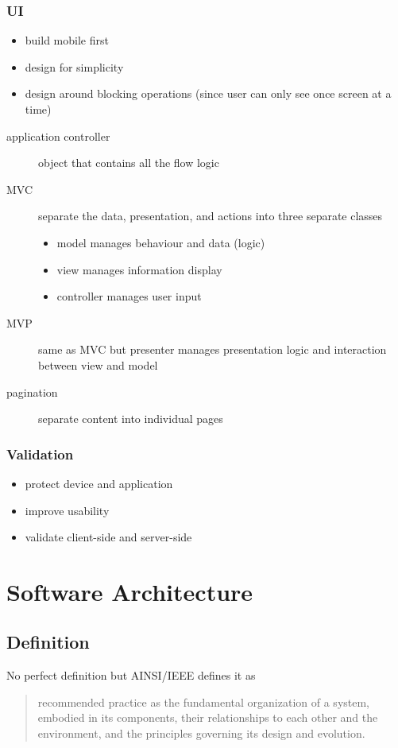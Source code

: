 \documentclass[]{article}
\theoremstyle{definition}
\begin{document}
	\subsubsection{UI}
	\begin{itemize}
		\item build mobile first
		\item design for simplicity
		\item design around blocking operations (since user can only see once screen at a time)
	\end{itemize}
	\begin{description}
		\item[application controller] object that contains all the flow logic 
		\item[MVC] separate the data, presentation, and actions into three separate classes
			\begin{itemize}
				\item model manages behaviour and data (logic)
				\item view manages information display
				\item controller manages user input
			\end{itemize}
		\item[MVP] same as MVC but presenter manages presentation logic and interaction between view and model
		\item[pagination] separate content into individual pages
	\end{description}

	\subsubsection{Validation}
	\begin{itemize}
		\item protect device and application
		\item improve usability
		\item validate client-side and server-side
	\end{itemize}

	\section{Software Architecture}
	\subsection{Definition}
	No perfect definition but AINSI/IEEE defines it as
	
	\begin{quote}
	recommended practice as the fundamental organization of a system, embodied in its components, their relationships to each other and the environment, and the principles governing its design and evolution. 
	\end{quote}
\end{document}
